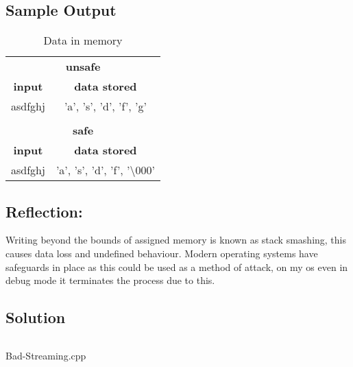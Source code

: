 \documentclass[Lab-B.tex]{subfiles}
\begin{document}
        \subsection{Sample Output}
            \begin{table}[H]
                \centering
                \begin{tabular}{c c}
                    \hline
                    \multicolumn{2}{c}{\textbf{unsafe}} \\
                    \textbf{input} & \textbf{data stored} \\
                    \hline
                    asdfghj & 'a', 's', 'd', 'f', 'g' \\
                    \\
                    \hline
                    \multicolumn{2}{c}{\textbf{safe}} \\
                    \textbf{input} & \textbf{data stored} \\
                    \hline
                    asdfghj & 'a', 's', 'd', 'f', '\textbackslash000' \\
                    
                \end{tabular}
                \caption{Data in memory}
            \end{table}

        \subsection*{Reflection:}
            Writing beyond the bounds of assigned memory is known as stack smashing,
            this causes data loss and undefined behaviour. Modern operating systems
            have safeguards in place as this could be used as a method of attack,
            on my os even in debug mode it terminates the process due to this.
        
        \subsection{Solution}
            \begin{listing}[H]
                \inputminted{cpp}{../Tasks/02-Bad-Streaming/Bad-Streaming.cpp}%
                \caption{Bad-Streaming.cpp}
            \end{listing}
\end{document}
